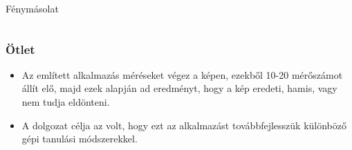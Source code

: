 \documentclass[11pt]{beamer}
\begin{document}
\begin{frame}
\begin{columns}[t]
\begin{column}{.5\textwidth}
			\centering
			Fénymásolat
			
		\end{column}				
	\end{columns}
	
	
	

\end{frame}

\begin{frame}
	\frametitle{Ötlet}
	
	
	\begin{itemize}
		\item 
		Az említett alkalmazás méréseket végez a képen, ezekből 10-20 mérőszámot állít elő, majd ezek alapján ad eredményt, hogy a kép eredeti, hamis, vagy nem tudja eldönteni.
		
		\item 
		A dolgozat célja az volt, hogy ezt az alkalmazást továbbfejlesszük különböző gépi tanulási módszerekkel.
		
		
	\end{itemize}
\end{frame}
\end{document}
